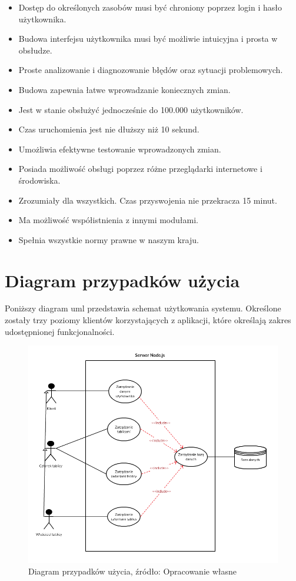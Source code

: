 \documentclass[12pt]{report}
\begin{document}
\begin{itemize}
\item Dostęp do określonych zasobów musi być chroniony poprzez login i hasło użytkownika.
\item Budowa interfejsu użytkownika musi być możliwie intuicyjna i prosta w obsłudze.
\item Proste analizowanie i diagnozowanie błędów oraz sytuacji problemowych.
\item Budowa zapewnia łatwe wprowadzanie koniecznych zmian.
\item Jest w stanie obsłużyć jednocześnie do 100.000 użytkowników.
\item Czas uruchomienia jest nie dłuższy niż 10 sekund.
\item Umożliwia efektywne testowanie wprowadzonych zmian.
\item Posiada możliwość obsługi poprzez różne przeglądarki internetowe i środowiska.
\item Zrozumiały dla wszystkich.
Czas przyswojenia nie przekracza 15 minut.
\item Ma możliwość współistnienia z innymi modułami.
\item Spełnia wszystkie normy prawne w naszym kraju.
\end{itemize}
\newpage
\section{Diagram przypadków użycia}
Poniższy diagram uml przedstawia schemat użytkowania systemu.
Określone zostały trzy poziomy klientów korzystających z aplikacji, które określają zakres udostępnionej funkcjonalności.

\begin{figure}[!hb]
\centering
\includegraphics[width=\textwidth,height=\textheight,keepaspectratio]{SCHEME.png}
\caption{Diagram przypadków użycia, źródło: Opracowanie własne}
\end{figure}
\end{document}
